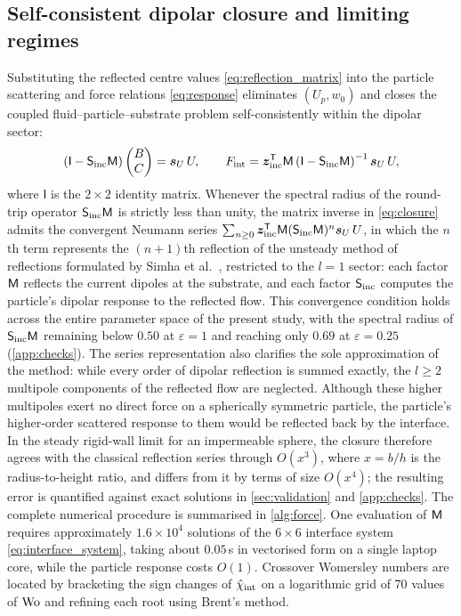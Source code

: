 \subsection{Self-consistent dipolar closure and limiting regimes}\label{sec:closure}
Substituting the reflected centre values \cref{eq:reflection_matrix} into the particle scattering and force relations
\cref{eq:response} eliminates $(U_p,w_0)$ and closes the coupled fluid--particle--substrate problem self-consistently
within the dipolar sector:
\begin{equation}
  \left(\mathsf I-\mathsf S_{\rm inc}\mathsf{M}\right)\begin{pmatrix}B\\ C\end{pmatrix}=\bm s_U\,U,
  \qquad
  F_{\rm int}=\bm z_{\rm inc}^{\mathsf T}\mathsf{M}\left(\mathsf I-\mathsf S_{\rm inc}\mathsf{M}\right)^{-1}\bm s_U\,U,
  \label{eq:closure}
\end{equation}
where $\mathsf I$ is the $2\times2$ identity matrix. Whenever the spectral radius of the round-trip operator
$\mathsf S_{\rm inc}\mathsf{M}$ is strictly less than unity, the matrix inverse in \cref{eq:closure} admits the convergent Neumann
series $\sum_{n\ge0}\bm z_{\rm inc}^{\mathsf T}\mathsf{M}(\mathsf S_{\rm inc}\mathsf{M})^n\bm s_U\,U$, in which the $n$th term
represents the $(n+1)$th reflection of the unsteady method of reflections formulated by Simha et
al.~\cite{simha2018unsteady}, restricted to the $l=1$ sector: each factor $\mathsf{M}$ reflects the current dipoles at the
substrate, and each factor $\mathsf S_{\rm inc}$ computes the particle's dipolar response to the reflected flow. This
convergence condition holds across the entire parameter space of the present study, with the spectral radius of
$\mathsf S_{\rm inc}\mathsf{M}$ remaining below $0.50$ at $\varepsilon=1$ and reaching only $0.69$ at $\varepsilon=0.25$
(\cref{app:checks}). The series representation also clarifies the sole approximation of the method: while every order of
dipolar reflection is summed exactly, the $l\ge2$ multipole components of the reflected flow are neglected. Although
these higher multipoles exert no direct force on a spherically symmetric particle, the particle's higher-order scattered
response to them would be reflected back by the interface. In the steady rigid-wall limit for an impermeable sphere, the
closure therefore agrees with the classical reflection series through $O(x^3)$, where $x=b/h$ is the radius-to-height
ratio, and differs from it by terms of size $O(x^4)$; the resulting error is quantified against exact solutions in
\cref{sec:validation} and \cref{app:checks}. The complete numerical procedure is summarised in \cref{alg:force}. One
evaluation of $\mathsf{M}$ requires approximately $1.6\times10^4$ solutions of the $6\times6$ interface system
\cref{eq:interface_system}, taking about $0.05$\,s in vectorised form on a single laptop core, while the particle
response costs $O(1)$. Crossover Womersley numbers are located by bracketing the sign changes of $\hat\chi_{\rm int}$ on a
logarithmic grid of 70 values of $\mathrm{Wo}$ and refining each root using Brent's method.

